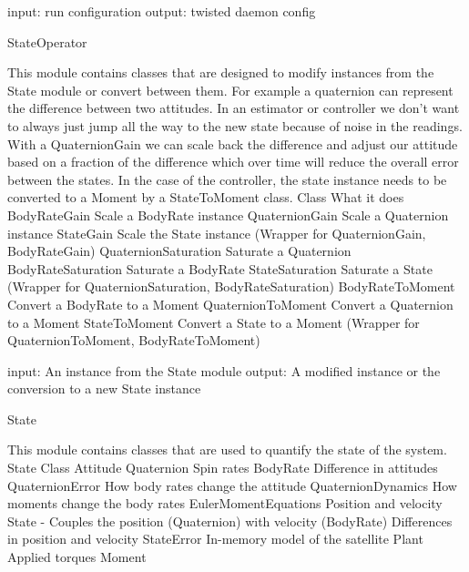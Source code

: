     input: run configuration
    output: twisted daemon config

StateOperator

This module contains classes that are designed to modify instances from the State module or convert between them. For example a quaternion can represent the difference between two attitudes. In an estimator or controller we don't want to always just jump all the way to the new state because of noise in the readings. With a QuaternionGain we can scale back the difference and adjust our attitude based on a fraction of the difference which over time will reduce the overall error between the states. In the case of the controller, the state instance needs to be converted to a Moment by a StateToMoment class.
Class   What it does
BodyRateGain  Scale a BodyRate instance
QuaternionGain  Scale a Quaternion instance
StateGain   Scale the State instance (Wrapper for QuaternionGain, BodyRateGain)
QuaternionSaturation  Saturate a Quaternion
BodyRateSaturation  Saturate a BodyRate
StateSaturation   Saturate a State (Wrapper for QuaternionSaturation, BodyRateSaturation)
BodyRateToMoment  Convert a BodyRate to a Moment
QuaternionToMoment  Convert a Quaternion to a Moment
StateToMoment   Convert a State to a Moment (Wrapper for QuaternionToMoment, BodyRateToMoment)

    input: An instance from the State module
    output: A modified instance or the conversion to a new State instance

State

This module contains classes that are used to quantify the state of the system.
State   Class
Attitude  Quaternion
Spin rates  BodyRate
Difference in attitudes   QuaternionError
How body rates change the attitude  QuaternionDynamics
How moments change the body rates   EulerMomentEquations
Position and velocity   State - Couples the position (Quaternion) with velocity (BodyRate)
Differences in position and velocity  StateError
In-memory model of the satellite  Plant
Applied torques   Moment

